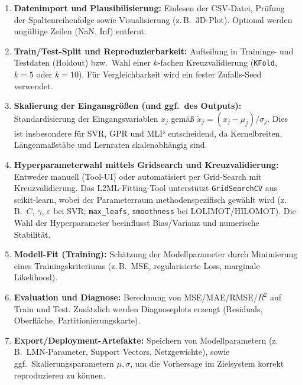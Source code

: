 \documentclass[11pt,a4paper]{report}
\begin{document}
\begin{enumerate}[label=\textbf{Schritt \arabic*:}, leftmargin=2.2cm]
\item \textbf{Datenimport und Plausibilisierung:}
      Einlesen der CSV-Datei, Pr\"{u}fung der Spaltenreihenfolge sowie Visualisierung
      (z.\,B.\ 3D-Plot). Optional werden ung\"{u}ltige Zeilen (NaN, Inf) entfernt.

\item \textbf{Train/Test-Split und Reproduzierbarkeit:}
      Aufteilung in Trainings- und Testdaten (Holdout) bzw.\ Wahl einer $k$-fachen
      Kreuzvalidierung (\texttt{KFold}, $k = 5$ oder $k = 10$).
      F\"{u}r Vergleichbarkeit wird ein fester Zufalls-Seed verwendet.

\item \textbf{Skalierung der Eingansgr\"{o}\ss{}en (und ggf.\ des Outputs):}
      Standardisierung der Eingangsvariablen $x_j$ gem\"{a}\ss{}
      $\tilde{x}_j = (x_j-\mu_j)/\sigma_j$.
      Dies ist insbesondere f\"{u}r SVR, GPR und MLP entscheidend, da Kernelbreiten,
      L\"{a}ngenma\ss{}st\"{a}be und Lernraten skalenabh\"{a}ngig sind.

\item \textbf{Hyperparameterwahl mittels Gridsearch und Kreuzvalidierung:}
      Entweder manuell (Tool-UI) oder automatisiert per Grid-Search mit Kreuzvalidierung.
      Das L2ML-Fitting-Tool unterst\"{u}tzt \texttt{GridSearchCV} aus scikit-learn, wobei
      der Parameterraum methodenspezifisch gew\"{a}hlt wird (z.\,B.\ $C$, $\gamma$, $\varepsilon$
      bei SVR; \texttt{max\_leafs}, \texttt{smoothness} bei LOLIMOT/HILOMOT).
      Die Wahl der Hyperparameter beeinflusst Bias/Varianz und numerische Stabilit\"{a}t.

\item \textbf{Modell-Fit (Training):}
      Sch\"{a}tzung der Modellparameter durch Minimierung eines Trainingskriteriums
      (z.\,B.\ MSE, regularisierte Loss, marginale Likelihood).

\item \textbf{Evaluation und Diagnose:}
      Berechnung von MSE/MAE/RMSE/$R^2$ auf Train und Test.
      Zus\"{a}tzlich werden Diagnoseplots erzeugt (Residuals, Oberfl\"{a}che,
      Partitionierungskarte).

\item \textbf{Export/Deployment-Artefakte:}
      Speichern von Modellparametern (z.\,B.\ LMN-Parameter, Support Vectors,
      Netzgewichte), sowie ggf.\ Skalierungsparametern $\mu,\sigma$, um die Vorhersage
      im Zielsystem korrekt reproduzieren zu k\"{o}nnen.
\end{enumerate}
\end{document}
